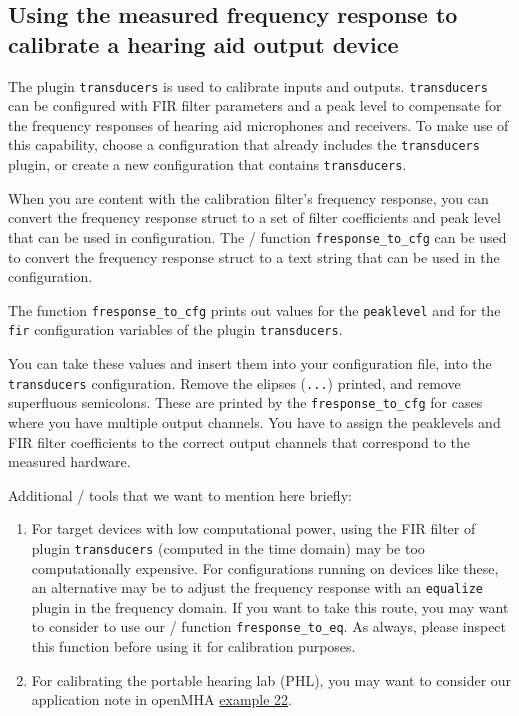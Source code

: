 \documentclass[11pt,a4paper,twoside]{article}
\newcommand{\+}{\discretionary{\mbox{\scriptsize$\hookleftarrow$}}{}{}}
\begin{document}
\subsection{Using the measured frequency response to calibrate a hearing aid output device}

The \mha{} plugin \texttt{transducers} is used to calibrate inputs and outputs.
%
\texttt{transducers} can be configured with FIR filter parameters and a peak level
to compensate for the frequency responses of hearing aid microphones and receivers.
%
To make use of this capability, choose a \mha{} configuration that already includes
the \texttt{transducers} plugin, or create a new configuration that contains
\texttt{transducers}.

When you are content with the calibration filter's frequency response,
you can convert the frequency response struct to a set of filter
coefficients and peak level that can be used in \mha{} configuration.
%
The \Octave{}/\Matlab{} function \texttt{fresponse\_to\_cfg} can be
used to convert the frequency response struct to a text string that
can be used in the \mha{} configuration.

The function \texttt{fresponse\_to\_cfg} prints out values for the
\texttt{peaklevel} and for the \texttt{fir} configuration variables of
the \mha{} plugin \texttt{transducers}.

You can take these values and insert them into your configuration file,
into the \texttt{transducers} configuration.
%
Remove the elipses (\texttt{...}) printed, and remove superfluous
semicolons.
%
These are printed by the \texttt{fresponse\_to\_cfg} for cases where
you have multiple output channels. You have to assign the peaklevels
and FIR filter coefficients to the correct output channels that
correspond to the measured hardware.

Additional  \Octave{}/\Matlab{} tools that we want to mention here briefly:
\begin{enumerate}
  \item
    For target devices with low computational power, using the FIR filter
    of plugin \texttt{transducers} (computed in the time domain) may
    be too computationally expensive.
    For \mha{} configurations running on devices like these, an alternative
    may be to adjust the frequency response with an  \texttt{equalize} plugin
    in the frequency domain.
    If you want to take this route, you may want to consider to use our
    \Octave{}/\Matlab{} function \texttt{fresponse\_to\_eq}.
    As always, please inspect this function before using it for calibration
    purposes.
  \item
    For calibrating the portable hearing lab (PHL), you may want to consider our
    application note in openMHA
    \href{https://github.com/HoerTech-gGmbH/openMHA/tree/master/examples/22-phl-calibration}{
      example 22}.
\end{enumerate}
\end{document}
